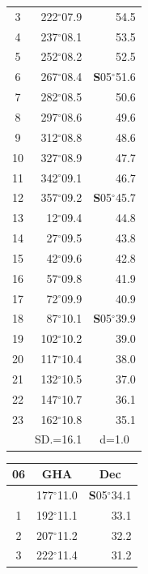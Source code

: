\documentclass[10pt, a4paper]{report}
\begin{document}
\begin{scriptsize}
\begin{tabular*}{0.2\textwidth}[t]{@{\extracolsep{\fill}}|c|rr|}
3 & 222$^\circ$07.9 & \raisebox{0.24ex}{\boldmath$\cdot$~\boldmath$\cdot$~~}54.5\\
4 & 237$^\circ$08.1 & 53.5\\
5 & 252$^\circ$08.2 & 52.5\\[2Pt]
6 & 267$^\circ$08.4 & \textbf{S}05$^\circ$51.6\\
7 & 282$^\circ$08.5 & 50.6\\
8 & 297$^\circ$08.6 & 49.6\\
9 & 312$^\circ$08.8 & \raisebox{0.24ex}{\boldmath$\cdot$~\boldmath$\cdot$~~}48.6\\
10 & 327$^\circ$08.9 & 47.7\\
11 & 342$^\circ$09.1 & 46.7\\[2Pt]
12 & 357$^\circ$09.2 & \textbf{S}05$^\circ$45.7\\
13 & 12$^\circ$09.4 & 44.8\\
14 & 27$^\circ$09.5 & 43.8\\
15 & 42$^\circ$09.6 & \raisebox{0.24ex}{\boldmath$\cdot$~\boldmath$\cdot$~~}42.8\\
16 & 57$^\circ$09.8 & 41.9\\
17 & 72$^\circ$09.9 & 40.9\\[2Pt]
18 & 87$^\circ$10.1 & \textbf{S}05$^\circ$39.9\\
19 & 102$^\circ$10.2 & 39.0\\
20 & 117$^\circ$10.4 & 38.0\\
21 & 132$^\circ$10.5 & \raisebox{0.24ex}{\boldmath$\cdot$~\boldmath$\cdot$~~}37.0\\
22 & 147$^\circ$10.7 & 36.1\\
23 & 162$^\circ$10.8 & 35.1\\
\hline
\rule{0pt}{2.4ex} & \multicolumn{1}{c}{SD.=16.1} & \multicolumn{1}{c|}{d=1.0}\\
\hline
\end{tabular*}\noindent
\begin{tabular*}{0.2\textwidth}[t]{@{\extracolsep{\fill}}|c|rr|}
\hline
\multicolumn{1}{|c|}{\rule{0pt}{2.6ex}\textbf{06}} & \multicolumn{1}{c}{\textbf{GHA}} & \multicolumn{1}{c|}{\textbf{Dec}}\\
\hline\rule{0pt}{2.6ex}\noindent
0 & 177$^\circ$11.0 & \textbf{S}05$^\circ$34.1\\
1 & 192$^\circ$11.1 & 33.1\\
2 & 207$^\circ$11.2 & 32.2\\
3 & 222$^\circ$11.4 & \raisebox{0.24ex}{\boldmath$\cdot$~\boldmath$\cdot$~~}31.2\\

\end{tabular*}
\end{scriptsize}
\end{document}
